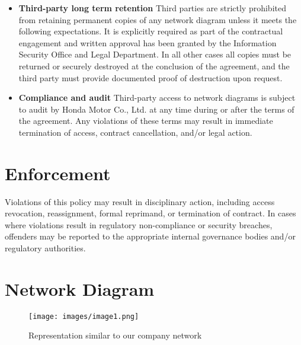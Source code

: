 \begin{itemize}
    \item \textbf{Third-party long term retention}
    Third parties are strictly prohibited from retaining permanent copies of any network diagram unless it meets the following expectations. It is explicitly required as part of the contractual engagement and written approval has been granted by the Information Security Office and Legal Department. In all other cases all copies must be returned or securely destroyed at the conclusion of the agreement, and the third party must provide documented proof of destruction upon request.
    \item \textbf{Compliance and audit}
    Third-party access to network diagrams is subject to audit by Honda Motor Co., Ltd. at any time during or after the terms of the agreement. Any violations of these terms may result in immediate termination of access, contract cancellation, and/or legal action.
\end{itemize}
\section{Enforcement}
Violations of this policy may result in disciplinary action, including access revocation, reassignment, formal reprimand, or termination of contract. In cases where violations result in regulatory non-compliance or security breaches, offenders may be reported to the appropriate internal governance bodies and/or regulatory authorities.

\section{Network Diagram}
\begin{figure}[htbp]
    \centering
    \texttt{[image: images/image1.png]}
    \caption{Representation similar to our company network}
    \label{fig:Diagram 7.23.2025}
\end{figure}